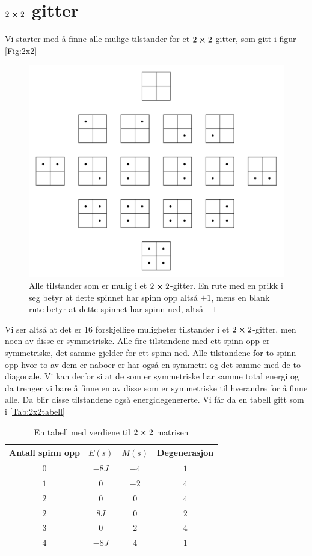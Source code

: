 \documentclass[reprint,english,notitlepage]{revtex4-2}  %
\begin{document}
\section{$2\cross 2$ gitter} \label{A}
Vi starter med å finne alle mulige tilstander for et $2\cross 2$ gitter, som gitt i figur \autoref{Fig:2x2}
\begin{figure}[H]
	\includegraphics[scale=0.5]{Latice.pdf}
	\caption{Alle tilstander som er mulig i et $2\cross2$-gitter. En rute med en prikk i seg betyr at dette spinnet har spinn opp altså $+1$, mens en blank rute betyr at dette spinnet har spinn ned, altså $-1$}
	\label{Fig:2x2}
\end{figure}
Vi ser altså at det er 16 forskjellige muligheter tilstander i et $2\cross2$-gitter, men noen av disse er symmetriske. Alle fire tilstandene med ett spinn opp er symmetriske, det samme gjelder for ett spinn ned. Alle tilstandene for to spinn opp hvor to av dem er naboer er har også en symmetri og det samme med de to diagonale. Vi kan derfor si at de som er symmetriske har samme total energi og da trenger vi bare å finne en av disse som er symmetriske til hverandre for å finne alle. Da blir disse tilstandene også energidegenererte. Vi får da en tabell gitt som i \autoref{Tab:2x2tabell}
\begin{table}[H]
	\begin{tabular}{|c|c|c|c|} %
		\hline                    %
		Antall spinn opp & $E(s)$ & $M(s)$& Degenerasjon  \\
		\hline
		$0$ & $-8J$ & $-4$ & $1$ \\
		\hline
		$1$ & $0$ & $-2$ & 4\\
		\hline
		$2$ &$0$ &$0$ &$4$ \\\hline 
		$2$ &$8J$ &$0$&$2$ \\\hline 
		$3$&$0$&$2$&$4$ \\\hline 
		$4$&$-8J$&$4$&$1$ \\\hline 
	\end{tabular}
	\caption{En tabell med verdiene til $2\cross 2$ matrisen}
	\label{Tab:2x2tabell}
\end{table}
\end{document}
